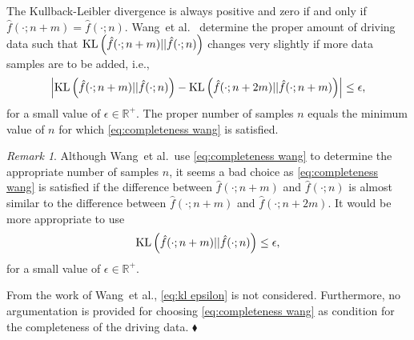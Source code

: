\documentclass[10pt,final,a4paper,oneside,onecolumn]{article}
\newcommand*{\etal}{et al.}                                     %
\newcommand{\kl}[2]{\textup{KL} \left( #1 || #2 \right)}
\theoremstyle{plain}\newtheorem{definition}{Definition}[section]    %
\theoremstyle{definition}\newtheorem{example}{Example}[section]     %
\theoremstyle{remark}\newtheorem{remarkenv}{Remark}[section]        %
\newenvironment{remark}{\begin{remarkenv}}%
                       {\hfill$\blacklozenge$\end{remarkenv}}       %
\begin{document}
The Kullback-Leibler divergence is always positive and zero if and only if $\hat{f}(\cdot;n+m) = \hat{f}(\cdot;n)$. Wang~\etal\ \cite{wang2017much} determine the proper amount of driving data such that $\kl{\hat{f}(\cdot;n+m)}{\hat{f}(\cdot;n)}$ changes very slightly if more data samples are to be added, i.e.,
\begin{equation} \label{eq:completeness wang}
	\left| \kl{\hat{f}(\cdot;n+m)}{\hat{f}(\cdot;n)} - \kl{\hat{f}(\cdot;n+2m)}{\hat{f}(\cdot;n+m)} \right| \leq \epsilon,
\end{equation}
for a small value of $\epsilon\in\mathds{R}^+$. The proper number of samples $n$ equals the minimum value of $n$ for which \cref{eq:completeness wang} is satisfied.

\begin{remark}
	Although Wang~\etal\ use \cref{eq:completeness wang} to determine the appropriate number of samples $n$, it seems a bad choice as \cref{eq:completeness wang} is satisfied if the difference between $\hat{f}(\cdot;n+m)$ and $\hat{f}(\cdot;n)$ is almost similar to the difference between $\hat{f}(\cdot;n+m)$ and $\hat{f}(\cdot;n+2m)$. It would be more appropriate to use
	\begin{equation} \label{eq:kl epsilon}
		\kl{\hat{f}(\cdot;n+m)}{\hat{f}(\cdot;n)} \leq \epsilon,
	\end{equation}
	for a small value of $\epsilon\in\mathds{R}^+$.
	
	From the work of Wang~\etal, \cref{eq:kl epsilon} is not considered. Furthermore, no argumentation is provided for choosing \cref{eq:completeness wang} as condition for the completeness of the driving data.
\end{remark}
\end{document}
